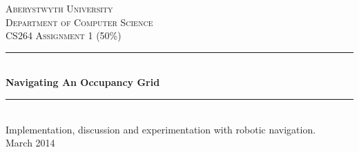 \begin{titlepage}

\newcommand{\HRule}{\rule{\linewidth}{0.5mm}} %

\center %
 

\textsc{\LARGE Aberystwyth University}\\[1.5cm] %
\textsc{\Large Department of Computer Science}\\[0.5cm] %
\textsc{\large CS264 Assignment 1 (50\%)}{}\\[0.5cm] %


\HRule \\[0.4cm]
{ \huge \bfseries Navigating An Occupancy Grid}\\[0.4cm] %
\HRule \\[1.5cm]
 
Implementation, discussion and experimentation with robotic navigation.\\[1cm]

{\large March 2014}\\[1cm] %

\vfill %

\end{titlepage}


